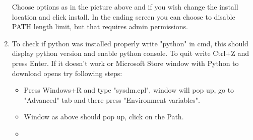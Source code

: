 \documentclass[a4paper,12pt]{book}
\begin{document}
\begin{enumerate}
\begin{minipage}[t]{\linewidth}
{		}		
		\medskip	
	\end{minipage}
	Choose options as in the picture above and if you wish change the install location and click install. In the ending screen you can choose to disable PATH length limit, but that requires admin permissions.
	\item To check if python was installed properly write "python" in cmd, this should display python version and enable python console. To quit write Ctrl+Z and press Enter. If it doesn't work or Microsoft Store window with Python to download opens try following steps:
	\begin{itemize}
		\item Press Windows+R and type "sysdm.cpl", window will pop up, go to "Advanced" tab and there press "Environment variables".
		\item \begin{minipage}[t]{\linewidth}
			\raggedright
			\medskip	
		\end{minipage}
		Window as above should pop up, click on the Path.
		\item \begin{minipage}[t]{\linewidth}
			\raggedright
\end{minipage}
\end{itemize}
\end{enumerate}
\end{document}
